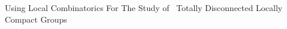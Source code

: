 \documentclass[preview]{standalone}
\begin{document}
\begin{center}
Using Local Combinatorics For The Study of \ Totally Disconnected Locally Compact Groups
\end{center}
\end{document}
